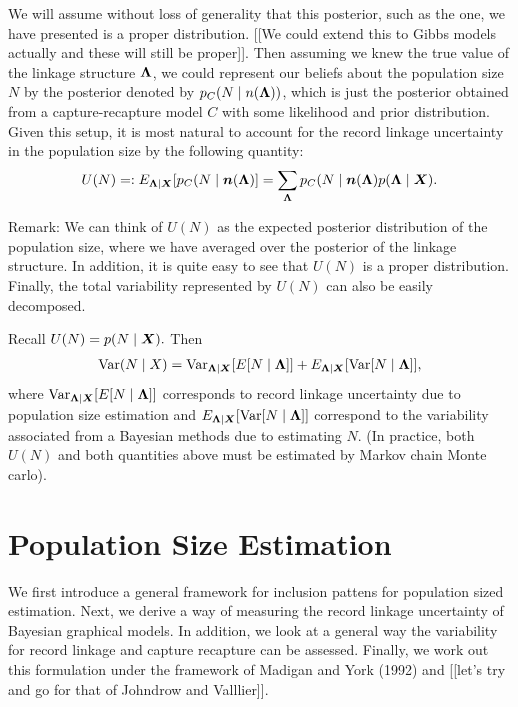 \documentclass[twoside]{article}
\newcommand{\n}{\boldsymbol{n}}
\newcommand{\Var}{\text{Var}}
\begin{document}
We will assume without loss of generality that this posterior, such as the one, we have presented is a proper distribution. [[We could extend this to Gibbs models actually and these will still be proper]]. Then assuming we knew the true value of the linkage structure $\boldsymbol{\Lambda}$, we could represent our beliefs about the population size $N$ by the posterior denoted by $p_C(N \mid n(\boldsymbol{\Lambda}))$, which is just the posterior obtained from a capture-recapture model $C$ with some likelihood and prior distribution. Given this setup, it is most natural to account for the record linkage uncertainty in the population size by the following quantity:
\begin{align}
U(N) =: E_{\lam \mid \bX} [p_C(N \mid \n(\lam)] = \sum_{\lam} p_C(N\mid \n(\lam) p(\lam \mid \bX).
\end{align}

Remark: We can think of $U(N)$ as the expected posterior distribution of the population size, where we have averaged over the posterior of the linkage structure. In addition, it is quite easy to see that $U(N)$ is a proper distribution. Finally, the total variability represented by $U(N)$ can also be easily decomposed. 

Recall $U(N) = p(N \mid \bm{X}).$ Then 
\begin{align}
\Var (N\mid X) = \Var_{\lam \mid \bX} [E[N \mid \lam ]] + E_{\lam \mid \bX} [\Var[N \mid \lam ]],
\end{align}
where
$\Var_{\lam \mid \bX} [E[N \mid \lam ]]$
corresponds to record linkage uncertainty due to population size estimation and 
$E_{\lam \mid \bX} [\Var[N \mid \lam ]]$
correspond to the variability associated from a Bayesian methods due to estimating $N.$ (In practice, both $U(N)$ and both quantities above must be estimated by Markov chain Monte carlo).


\section{Population Size Estimation}
We first introduce a general framework for inclusion pattens for population sized estimation. Next, we derive a way of measuring the record linkage uncertainty of Bayesian graphical models. In addition, we look at a general way the variability for record linkage and capture recapture can be assessed. Finally, we work out this formulation under the framework of Madigan and York (1992) and [[let's try and go for that of Johndrow and Valllier]]. 
\end{document}
